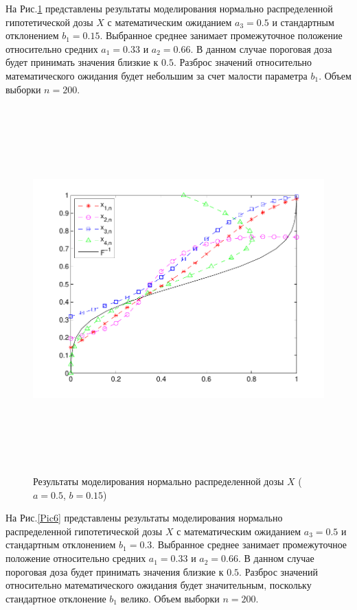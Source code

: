 \documentclass[a4paper,14pt,russian]{article}
\begin{document}
На Рис.\ref{Pic5} представлены результаты моделирования нормально распределенной гипотетической дозы $X$ с математическим ожиданием $a_3 = 0.5$ и стандартным отклонением $b_1 = 0.15$. Выбранное среднее занимает промежуточное положение относительно средних $a_1 = 0.33$ и $a_2 = 0.66$. В данном случае пороговая доза будет принимать значения близкие к $0.5$. Разброс значений относительно математического ожидания будет небольшим за счет малости параметра $b_1$. Объем выборки $n = 200$.
\begin{figure}[h]
\center
\caption{Результаты моделирования нормально распределенной дозы $X$ ($a=0.5$,  $b=0.15$)}\label{Pic5}
\includegraphics[width = 500pt,height = 400pt]{13.pdf}
\end{figure}
\newpage
На Рис.\ref{Pic6} представлены результаты моделирования нормально распределенной гипотетической дозы $X$ с математическим ожиданием $a_3 = 0.5$ и стандартным отклонением $b_1 = 0.3$. Выбранное среднее занимает промежуточное положение относительно средних $a_1 = 0.33$ и $a_2 = 0.66$. В данном случае пороговая доза будет принимать значения близкие к $0.5$. Разброс значений относительно математического ожидания будет значительным, поскольку стандартное отклонение $b_1$ велико. Объем выборки $n = 200$.
\end{document}
